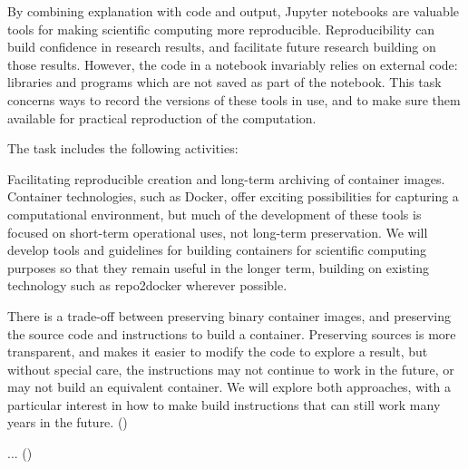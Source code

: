 \begin{task}[title=Archiving software for reproducible workflows,
  id=reproducibility,
  lead=XXX,
  PM=1,
  wphases={0-48},
  partners={SRL,XFEL}
]
  By combining explanation with code and output, Jupyter notebooks are
  valuable tools for making scientific computing more reproducible.
  Reproducibility can build confidence in research results, and facilitate
  future research building on those results.
  However, the code in a notebook invariably relies on external code: libraries
  and programs which are not saved as part of the notebook.
  This task concerns ways to record the versions of these tools in use, and to
  make sure them available for practical reproduction of the computation.

  The task includes the following activities:
  \begin{compactitem}
  \item Facilitating reproducible creation and long-term archiving of container
    images. Container technologies, such as Docker, offer exciting possibilities
    for capturing a computational environment, but much of the development of
    these tools is focused on short-term operational uses, not long-term
    preservation. We will develop tools and guidelines for building containers
    for scientific computing purposes so that they remain useful in the longer
    term, building on existing technology such as repo2docker wherever possible.

    There is a trade-off between preserving binary container images,
    and preserving the source code and instructions to build a container.
    Preserving sources is more transparent, and makes it easier to modify the
    code to explore a result, but without special care, the instructions may not
    continue to work in the future, or may not build an equivalent container.
    We will explore both approaches, with a particular interest in how to
    make build instructions that can still work many years in the future.
    ()
  \end{compactitem}
  \begin{compactitem}
  \item ...
    ()
  \end{compactitem}
\end{task}
